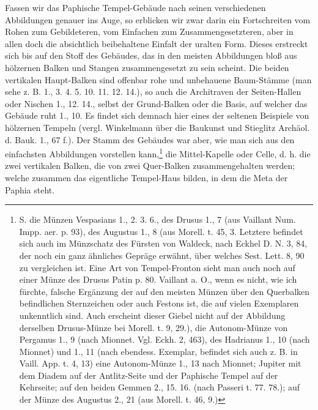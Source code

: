 \documentclass[a4paper, 11pt, oneside, polutonikogreek, german]{article}
\begin{document}
Fassen wir das Paphische Tempel-Gebäude nach seinen verschiedenen Abbildungen genauer ins Auge, so erblicken wir zwar darin ein Fortschreiten vom Rohen zum Gebildeteren, vom Einfachen zum Zusammengesetzteren, aber in allen doch die absichtlich beibehaltene Einfalt der uralten Form. Dieses erstreckt sich bis auf den Stoff des Gebäudes, das in den meisten Abbildungen bloß aus hölzernen Balken und Stangen zusammengesetzt zu sein scheint. Die beiden vertikalen Haupt-Balken sind offenbar rohe und unbehauene Baum-Stämme (man sehe z. B. 1., 3. 4. 5. 10. 11. 12. 14.), so auch die Architraven der Seiten-Hallen oder Nischen 1., 12. 14., selbst der Grund-Balken oder die Basis, auf welcher das Gebäude ruht 1., 10. Es findet sich demnach hier eines der seltenen Beispiele von hölzernen Tempeln (vergl. Winkelmann über die Baukunst und Stieglitz Archäol. d. Bauk. 1., 67 f.). Der Stamm des Gebäudes war aber, wie man sich aus den einfachsten Abbildungen vorstellen kann,\footnote{S. die Münzen Vespasians 1., 2. 3. 6., des Drusus 1., 7 (aus Vaillant Num. Impp. aer. p. 93), des Augustus 1., 8 (aus Morell. t. 45, 3. Letztere befindet sich auch im Münzschatz des Fürsten von Waldeck, nach Eckhel D. N. 3, 84, der noch ein ganz ähnliches Gepräge erwähnt, über welches Sest. Lett. 8, 90 zu vergleichen ist. Eine Art von Tempel-Fronton sieht man auch noch auf einer Münze des Drusus Patin p. 80. Vaillant a. O., wenn es nicht, wie ich fürchte, falsche Ergänzung der auf den meisten Münzen über den Querbalken befindlichen Sternzeichen oder auch Festons ist, die auf vielen Exemplaren unkenntlich sind. Auch erscheint dieser Giebel nicht auf der Abbildung derselben Drusus-Münze bei Morell. t. 9, 29.), die Autonom-Münze von Pergamus 1., 9 (nach Mionnet. Vgl. Eckh. 2, 463), des Hadrianus 1., 10 (nach Mionnet) und 1., 11 (nach ebendess. Exemplar, befindet sich auch z. B. in Vaill. App. t. 4, 13) eine Autonom-Münze 1., 13 nach Mionnet; Jupiter mit dem Diadem auf der Antlitz-Seite und der Paphische Tempel auf der Kehrseite; auf den beiden Gemmen 2., 15. 16. (nach Passeri t. 77. 78.); auf der Münze des Augustus 2., 21 (aus Morell. t. 46, 9.)} die Mittel-Kapelle oder Celle, d. h. die zwei vertikalen Balken, die von zwei Quer-Balken zusammengehalten werden; welche zusammen das eigentliche Tempel-Haus bilden, in dem die Meta der Paphia steht.
\end{document}
